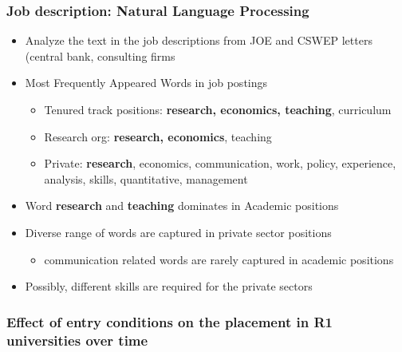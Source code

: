 \documentclass[11pt]{beamer}
\begin{document}
\begin{frame}[label = NLP]
	\frametitle{Job description: Natural Language Processing}
	\begin{itemize}
		\item Analyze the text in the job descriptions from JOE and CSWEP letters (central bank, consulting firms
		\item Most Frequently Appeared Words in job postings
		\begin{itemize}
			\item Tenured track positions: \textbf{research, economics, teaching}, curriculum
			\item Research org: \textbf{research, economics}, teaching
			\item Private: \textbf{research}, economics, communication, work, policy, experience, analysis, skills, quantitative, management
		\end{itemize}
		
		\item Word \textbf{research} and \textbf{teaching} dominates in Academic positions
		\item Diverse range of words are captured in private sector positions
		\begin{itemize}
			\item communication related words are rarely captured in academic positions
		\end{itemize} 
		\item Possibly, different skills are required for the private sectors \hyperlink{Occupation}{}
	\end{itemize}
\end{frame}




{
	\begin{frame}[label = signal]
		\frametitle{Effect of entry conditions on the placement in R1 universities over time}
		
		\hyperlink{discussion}{}
	\end{frame}
}
\end{document}
